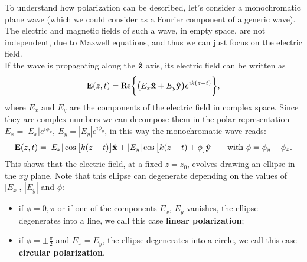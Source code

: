 To understand how polarization can be described, let's consider a monochromatic plane wave (which we could consider as a Fourier component of a generic wave). The electric and magnetic fields of such a wave, in empty space, are not independent, due to Maxwell equations, and thus we can just focus on the electric field.\\ 
If the wave is propagating along the $\mathbf{\hat{z}}$ axis, its electric field can be written as
$$ \mathbf{E}(z,t) = \text{Re}\bigg\{\big(E_{x}\mathbf{\hat{x}}+E_y\mathbf{\hat{y}}\big)e^{ik(z-t)}\bigg\},$$
where $E_x$ and $E_y$ are the components of the electric field in complex space. Since they are complex numbers we can decompose them in the polar representation $E_x=|E_x|e^{i\phi_x},\ E_y=|E_y|e^{i\phi_y}$, in this way the monochromatic wave reads:
$$ \mathbf{E}(z,t) = |E_x|\cos\big[k(z-t)\big]\mathbf{\hat{x}}+|E_y|\cos\big[k(z-t)+\phi\big]\mathbf{\hat{y}} \qquad\text{with}\ \phi=\phi_y-\phi_x.$$
This shows that the electric field, at a fixed $z=z_0$, evolves drawing an ellipse in the $xy$ plane. Note that this ellipse can degenerate depending on the values of $|E_x|$, $|E_y|$ and $\phi$:
\begin{itemize}
    \item if $\phi=0,\pi$ or if one of the components $E_x$, $E_y$ vanishes, the ellipse degenerates into a line, we call this case \textbf{linear polarization};
    \item if $\phi=\pm\frac{\pi}{2}$ and $E_x=E_y$, the ellipse degenerates into a circle, we call this case \textbf{circular polarization}.
\end{itemize}

